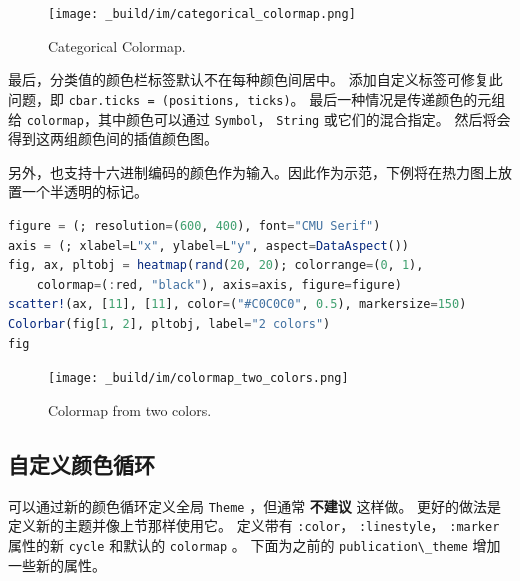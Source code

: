 \documentclass[
  notoc %
]{tufte-book}
\newcommand{\passthrough}[1]{#1}
\begin{document}
\begin{figure}
\hypertarget{fig:categorical_colormap}{%
\centering
\texttt{[image: \_build/im/categorical\_colormap.png]}
\caption{Categorical Colormap.}\label{fig:categorical_colormap}
}
\end{figure}

最后，分类值的颜色栏标签默认不在每种颜色间居中。
添加自定义标签可修复此问题，即
\passthrough{\lstinline!cbar.ticks = (positions, ticks)!}。
最后一种情况是传递颜色的元组给
\passthrough{\lstinline!colormap!}，其中颜色可以通过
\passthrough{\lstinline!Symbol!}， \passthrough{\lstinline!String!}
或它们的混合指定。 然后将会得到这两组颜色间的插值颜色图。

另外，也支持十六进制编码的颜色作为输入。因此作为示范，下例将在热力图上放置一个半透明的标记。

\begin{lstlisting}[language=Julia]
figure = (; resolution=(600, 400), font="CMU Serif")
axis = (; xlabel=L"x", ylabel=L"y", aspect=DataAspect())
fig, ax, pltobj = heatmap(rand(20, 20); colorrange=(0, 1),
    colormap=(:red, "black"), axis=axis, figure=figure)
scatter!(ax, [11], [11], color=("#C0C0C0", 0.5), markersize=150)
Colorbar(fig[1, 2], pltobj, label="2 colors")
fig
\end{lstlisting}

\begin{figure}
\hypertarget{fig:colormap_two_colors}{%
\centering
\texttt{[image: \_build/im/colormap\_two\_colors.png]}
\caption{Colormap from two colors.}\label{fig:colormap_two_colors}
}
\end{figure}

\hypertarget{ux81eaux5b9aux4e49ux989cux8272ux5faaux73af}{%
\subsection{自定义颜色循环}\label{ux81eaux5b9aux4e49ux989cux8272ux5faaux73af}}

可以通过新的颜色循环定义全局 \passthrough{\lstinline!Theme!} ，但通常
\textbf{不建议} 这样做。 更好的做法是定义新的主题并像上节那样使用它。
定义带有 \passthrough{\lstinline!:color!}，
\passthrough{\lstinline!:linestyle!}， \passthrough{\lstinline!:marker!}
属性的新 \passthrough{\lstinline!cycle!} 和默认的
\passthrough{\lstinline!colormap!} 。 下面为之前的
\passthrough{\lstinline!publication\_theme!} 增加一些新的属性。
\end{document}
